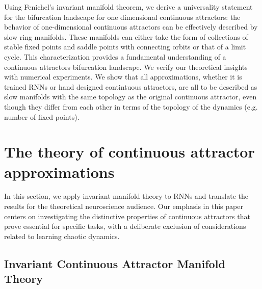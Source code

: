 \documentclass{article} %
\newcounter{ct}
\theoremstyle{definition}
\theoremstyle{remark}
\begin{document}
Using Fenichel's invariant manifold theorem, we derive a universality statement for the bifurcation landscape for one dimensional continuous attractors:
 the behavior of one-dimensional continuous attractors can be effectively described by slow ring manifolds.
 These manifolds can either take the form of collections of stable fixed points and saddle points with connecting orbits or that of a limit cycle. 
 This characterization provides a fundamental understanding of a continuous attractors bifurcation landscape.
We verify our theoretical insights with numerical experiments.
We show that all approximations, whether it is trained RNNs or hand designed contintuous attractors, are all to be described as slow manifolds with the same topology as the original continuous attractor,
even though they differ from each other in terms of the topology of the dynamics (e.g. number of fixed points).





\section{The theory of continuous attractor approximations}\label{sec:theory}
In this section, we apply invariant manifold theory to RNNs and translate the results for the theoretical neuroscience audience.
Our emphasis in this paper centers on investigating the distinctive properties of continuous attractors that prove essential for specific tasks, with a deliberate exclusion of considerations related to learning chaotic dynamics.



\subsection{Invariant Continuous Attractor Manifold Theory}\label{sec:imt}
\end{document}
